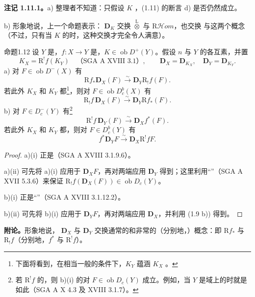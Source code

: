 \textbf{注记 1.11.1。}a) 整理者不知道：只假设 $K$ ，(1.11) 的断言 d) 是否仍然成立。

b) 形象地说，上一个命题表示： $\mathbf D_K$ 交换 $\mathbin{\overset{\mathrm L}{\otimes}}$ 与 $\mathrm R\mathcal Hom$，也交换 与这两个概念（不过，只有当 $K$ 的时，这种交换才完全令人满意）。

\begin{SGAresult}{命题}{1.12}
设 $Y$ 是，$f:X\longrightarrow Y$ 是，$K\in\operatorname{ob}D^+(Y)$。假设 $n$ 与 $Y$ 的各互素，并置
\[
 K_X=\mathrm R^!f(K_Y)\quad\text{（SGA A XVIII 3.1）},\qquad
 \mathbf D_X=\mathbf D_{K_X},\quad\mathbf D_Y=\mathbf D_{K_Y}.
\]
a) 对 $F\in\operatorname{ob}D^-(X)$ 有
\[
 \mathrm Rf_*\mathbf D_X(F)\xrightarrow{\sim}\mathbf D_Y\mathrm R_!f(F).\tag{i}
\]
若此外 $K_X$ 和 $K_Y$ 都\footnote[1]{下面将看到，在相当一般的条件下，$K_Y$ 蕴涵 $K_X$ 。}，则对 $F\in\operatorname{ob}D_c^b(X)$ 有
\[
 \mathrm R_!f\,\mathbf D_X(F)\xrightarrow{\sim}\mathbf D_Y\mathrm Rf_*(F).\tag{ii}
\]
b) 对 $F\in D_c^-(Y)$ 有\footnote[2]{若 $\mathrm R^!f$ 的，则 b)(i) 的对 $F\in\operatorname{ob}D_c(Y)$ 成立。例如，当 $Y$ 是域上的时就是如此（SGA A X 4.3 及 XVIII 3.1.7）。}
\[
 \mathrm R^!f\,\mathbf D_Y(F)\xrightarrow{\sim}\mathbf D_Xf^*(F).\tag{i}
\]
若此外 $K_X$ 和 $K_Y$ 都\footnotemark[1]，则对 $F\in D_c^b(Y)$ 有
\[
 f^*\mathbf D_YF\xrightarrow{\sim}\mathbf D_X\mathrm R^!fF.\tag{ii}
\]
\end{SGAresult}
\begin{proof}
a)(i) 正是（SGA A XVIII 3.1.9.6）。

a)(ii) 可先将 a)(i) 应用于 $\mathbf D_XF$，再对两端应用 $\mathbf D_Y$ 得到；这里利用“”（SGA A XVII 5.3.6）来保证 $\mathrm R_!f(\mathbf D_X(F))\in\operatorname{ob}D_c(Y)$。

b)(i) 正是“”（SGA A XVIII 3.1.12.2）。

b)(ii) 可先将 b)(i) 应用于 $\mathbf D_YF$，再对两端应用 $\mathbf D_X$，并利用 (1.9 b)) 得到。
\end{proof}
\textbf{附论。}形象地说，
$\mathbf D_X$ 与 $\mathbf D_Y$ 交换通常的和非常的（分别地，）概念：即 $\mathrm Rf_*$ 与 $\mathrm R_!f$（分别地，$f^*$ 与 $\mathrm R^!f$）。

